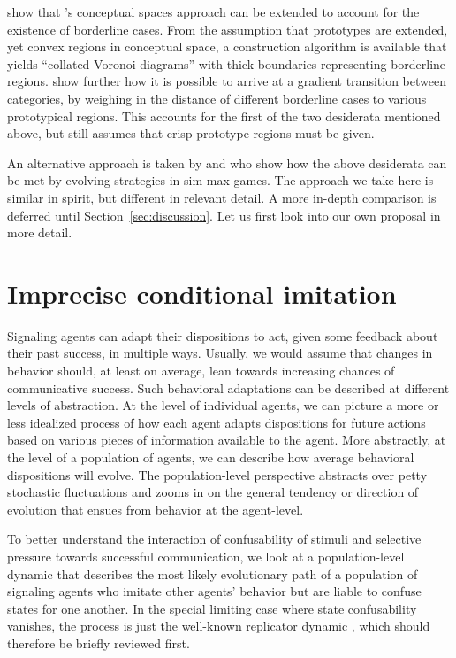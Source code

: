 \documentclass[fleqn,reqno,10pt]{article}
\begin{document}
\citet{DouvenDecock2011:Vagueness:-A-Co} show that
\citeauthor{Gardenfors2000:Conceptual-Spac}'s conceptual spaces
approach can be extended to account for the existence of borderline
cases. From the assumption that prototypes are extended, yet convex
regions in conceptual space, a construction algorithm is available
that yields ``collated Voronoi diagrams'' with thick boundaries
representing borderline
regions. \citet{DecockDouven2012:What-is-Graded-} show further how it
is possible to arrive at a gradient transition between categories, by
weighing in the distance of different borderline cases to various
prototypical regions. This accounts for the first of the two
desiderata mentioned above, but still assumes that crisp prototype
regions must be given.

An alternative approach is taken by \citet{FrankeJager2010:Vagueness-Signa} and
\citet{OConnor2013:The-Evolution-o} who show how the above desiderata can be met by evolving
strategies in sim-max games. The approach we take here is similar in spirit, but different in
relevant detail. A more in-depth comparison is deferred until Section~\ref{sec:discussion}. Let
us first look into our own proposal in more detail.



\section{Imprecise conditional imitation}
\label{sec:repl-diff-dynam}

Signaling agents can adapt their dispositions to act, given some feedback about their past
success, in multiple ways. Usually, we would assume that changes in behavior should, at least
on average, lean towards increasing chances of communicative success. Such behavioral
adaptations can be described at different levels of abstraction. At the level of individual
agents, we can picture a more or less idealized process of how each agent adapts dispositions
for future actions based on various pieces of information available to the agent. More
abstractly, at the level of a population of agents, we can describe how average behavioral
dispositions will evolve. The population-level perspective abstracts over petty stochastic
fluctuations and zooms in on the general tendency or direction of evolution that ensues from
behavior at the agent-level.

To better understand the interaction of confusability of stimuli and selective pressure towards
successful communication, we look at a population-level dynamic that describes the most likely
evolutionary path of a population of signaling agents who imitate other agents' behavior but
are liable to confuse states for one another. In the special limiting case where state
confusability vanishes, the process is just the well-known replicator dynamic
\citep{TaylorJonker1978:Evolutionary-St}, which should therefore be briefly reviewed first.
\end{document}
